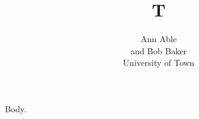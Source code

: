 \documentclass{article}
\begin{document}
\title{T}
\author{Ann Able\\ and Bob Baker\\ University of Town}
\maketitle
Body.
\end{document}
